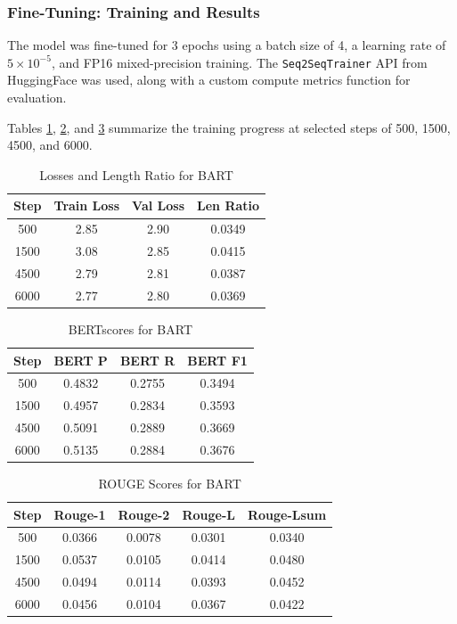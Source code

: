 \documentclass[11pt]{article}
\begin{document}
\subsubsection{Fine-Tuning: Training and Results}

The model was fine-tuned for 3 epochs using a batch size of 4, a learning rate of $5 \times 10^{-5}$, and FP16 mixed-precision training. The \texttt{Seq2SeqTrainer} API from HuggingFace was used, along with a custom compute metrics function for evaluation. 

Tables \ref{tab:losses_bart}, \ref{tab:bertscores_bart}, and \ref{tab:rouge_bart} summarize the training progress at selected steps of 500, 1500, 4500, and 6000.

\begin{table}[h!]
\centering
\caption{Losses and Length Ratio for BART}
\begin{tabular}{|c|c|c|c|}
\hline
\textbf{Step} & \textbf{Train Loss} & \textbf{Val Loss} & \textbf{Len Ratio} \\
\hline
500 & 2.85 & 2.90 & 0.0349 \\
1500 & 3.08 & 2.85 & 0.0415 \\
4500 & 2.79 & 2.81 & 0.0387 \\
6000 & 2.77 & 2.80 & 0.0369 \\
\hline
\end{tabular}
\label{tab:losses_bart}
\end{table}

\begin{table}[h!]
\centering
\caption{BERTscores for BART}
\begin{tabular}{|c|c|c|c|}
\hline
\textbf{Step} & \textbf{BERT P} & \textbf{BERT R} & \textbf{BERT F1} \\
\hline
500 & 0.4832 & 0.2755 & 0.3494 \\
1500 & 0.4957 & 0.2834 & 0.3593 \\
4500 & 0.5091 & 0.2889 & 0.3669 \\
6000 & 0.5135 & 0.2884 & 0.3676 \\
\hline
\end{tabular}
\label{tab:bertscores_bart}
\end{table}

\begin{table}[h!]
\centering
\small 
\setlength{\tabcolsep}{4pt} %
\caption{ROUGE Scores for BART}
\begin{tabular}{|c|c|c|c|c|}
\hline
\textbf{Step} & \textbf{Rouge-1} & \textbf{Rouge-2} & \textbf{Rouge-L} & \textbf{Rouge-Lsum} \\
\hline
500 & 0.0366 & 0.0078 & 0.0301 & 0.0340 \\
1500 & 0.0537 & 0.0105 & 0.0414 & 0.0480 \\
4500 & 0.0494 & 0.0114 & 0.0393 & 0.0452 \\
6000 & 0.0456 & 0.0104 & 0.0367 & 0.0422 \\
\hline
\end{tabular}
\label{tab:rouge_bart}
\end{table}
\end{document}
